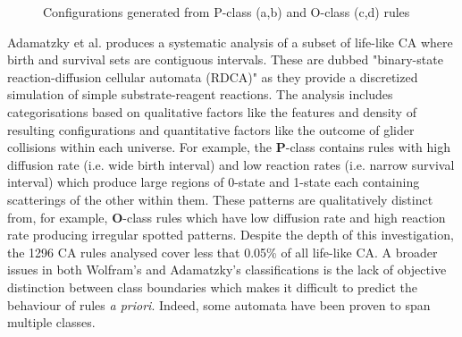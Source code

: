 \begin{figure}[!h]
\centering
            \hfill
            \hfill
            \hfill
            \caption{Configurations generated from P-class (a,b) and O-class (c,d) rules \cite{adamatzky2006phenomenology}}
\label{fig:po-class}
\end{figure}

Adamatzky et al.\cite{adamatzky2006phenomenology} produces a systematic analysis of a subset of life-like CA where birth and survival sets are contiguous intervals. These are dubbed "binary-state reaction-diffusion cellular automata (RDCA)" as they provide a discretized simulation of simple substrate-reagent reactions. The analysis includes categorisations based on qualitative factors like the features and density of resulting configurations and quantitative factors like the outcome of glider collisions within each universe. For example, the \textbf{P}-class contains rules with high diffusion rate (i.e. wide birth interval) and low reaction rates (i.e. narrow survival interval) which produce large regions of 0-state and 1-state each containing scatterings of the other within them. These patterns are qualitatively distinct from, for example, \textbf{O}-class rules which have low diffusion rate and high reaction rate producing irregular spotted patterns. Despite the depth of this investigation, the 1296 CA rules analysed cover less that 0.05\% of all life-like CA. A broader issues in both Wolfram's and Adamatzky's classifications is the lack of objective distinction between class boundaries which makes it difficult to predict the behaviour of rules \textit{a priori}. Indeed, some automata have been proven to span multiple classes\cite{baldwin1999classi}.\\

